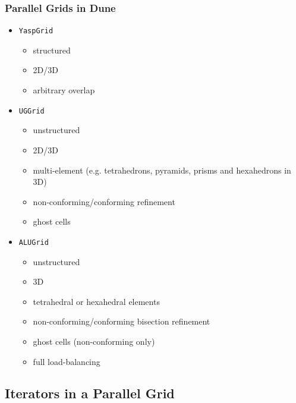 \begin{frame}
  \frametitle<presentation>{Parallel Grids in Dune}
  \begin{itemize}
  \item<1-> \lstinline!YaspGrid!
      \begin{itemize}
      \item structured
      \item 2D/3D
      \item arbitrary overlap
      \end{itemize}
  \item<2-> \lstinline!UGGrid!
      \begin{itemize}
      \item unstructured
      \item 2D/3D
      \item multi-element (e.g. tetrahedrons, pyramids, prisms and hexahedrons in 3D)
      \item non-conforming/conforming refinement
      \item ghost cells
      \end{itemize}
  \item<3-> \lstinline!ALUGrid!
      \begin{itemize}
      \item unstructured
      \item 3D
      \item tetrahedral or hexahedral elements
      \item non-conforming/conforming bisection refinement
      \item ghost cells (non-conforming only)
      \item full load-balancing
      \end{itemize}
  \end{itemize}
\end{frame}

\subsection{Iterators in a Parallel Grid}

